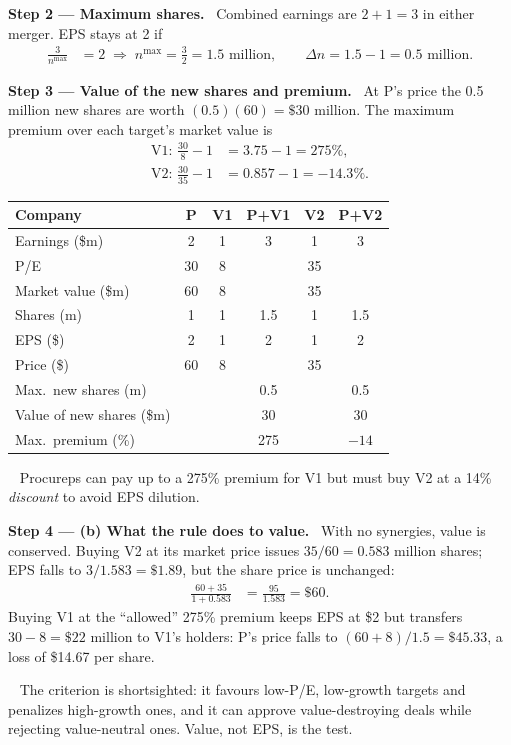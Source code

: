 \documentclass[11pt,a4paper]{article}
\newcommand{\step}[2]{\par\medskip\noindent\textbf{Step #1 --- #2.}~}
\newcommand{\answer}[1]{\par\smallskip\noindent\fbox{\textbf{Answer #1.}}~}
\begin{document}
\step{2}{Maximum shares} Combined earnings are $2+1=3$ in either merger. EPS stays at 2 if
\begin{align}
  \frac{3}{n^{\max}} &= 2 \;\Rightarrow\; n^{\max}=\frac{3}{2}=1.5 \text{ million}, \qquad \Delta n = 1.5-1 = 0.5\text{ million}. \label{r9e7-n}
\end{align}

\step{3}{Value of the new shares and premium} At P's price the 0.5 million new shares are worth
$(0.5)(60)=\$30$ million. The maximum premium over each target's market value is
\begin{align}
  \text{V1: }\frac{30}{8}-1 &= 3.75-1 = 275\%, \label{r9e7-v1}\\
  \text{V2: }\frac{30}{35}-1 &= 0.857-1 = -14.3\%. \label{r9e7-v2}
\end{align}

\begin{center}
\begin{tabular}{lccccc}
\toprule
Company & P & V1 & P+V1 & V2 & P+V2\\
\midrule
Earnings (\$m) & 2 & 1 & 3 & 1 & 3\\
P/E & 30 & 8 & & 35 & \\
Market value (\$m) & 60 & 8 & & 35 & \\
Shares (m) & 1 & 1 & 1.5 & 1 & 1.5\\
EPS (\$) & 2 & 1 & 2 & 1 & 2\\
Price (\$) & 60 & 8 & & 35 & \\
Max.\ new shares (m) & & & 0.5 & & 0.5\\
Value of new shares (\$m) & & & 30 & & 30\\
Max.\ premium (\%) & & & 275 & & $-14$\\
\bottomrule
\end{tabular}
\end{center}
\answer{(a)} Procureps can pay up to a 275\% premium for V1 but must buy V2 at a 14\% \emph{discount} to
avoid EPS dilution.

\step{4}{(b) What the rule does to value} With no synergies, value is conserved. Buying V2 at its market
price issues $35/60=0.583$ million shares; EPS falls to $3/1.583=\$1.89$, but the share price is unchanged:
\begin{align}
  \frac{60+35}{1+0.583} &= \frac{95}{1.583} = \$60. \nonumber
\end{align}
Buying V1 at the ``allowed'' 275\% premium keeps EPS at \$2 but transfers $30-8=\$22$ million to V1's
holders: P's price falls to $(60+8)/1.5=\$45.33$, a loss of \$14.67 per share.
\answer{(b)} The criterion is shortsighted: it favours low-P/E, low-growth targets and penalizes
high-growth ones, and it can approve value-destroying deals while rejecting value-neutral ones. Value, not
EPS, is the test.
\end{document}
